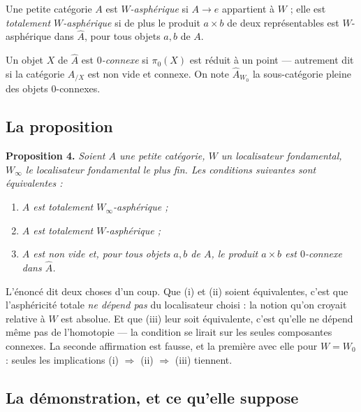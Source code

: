 \documentclass[11pt,a4paper]{article}
\begin{document}
Une petite catégorie $A$ est \emph{$W$-asphérique} si $A \to e$ appartient à
$W$ ; elle est \emph{totalement $W$-asphérique} si de plus le produit
$a \times b$ de deux représentables est $W$-asphérique dans $\hat{A}$, pour tous
objets $a, b$ de $A$.

Un objet $X$ de $\hat{A}$ est \emph{$0$-connexe} si $\pi_{0}(X)$ est réduit à un
point — autrement dit si la catégorie $A_{/X}$ est non vide et connexe. On note
$\hat{A}_{W_{0}}$ la sous-catégorie pleine des objets $0$-connexes.

\subsection*{La proposition}

\textbf{Proposition 4.} \emph{Soient $A$ une petite catégorie, $W$ un
localisateur fondamental, $W_{\infty}$ le localisateur fondamental le plus fin.
Les conditions suivantes sont équivalentes :}

\begin{enumerate}
\item[(i)] \emph{$A$ est totalement $W_{\infty}$-asphérique ;}
\item[(ii)] \emph{$A$ est totalement $W$-asphérique ;}
\item[(iii)] \emph{$A$ est non vide et, pour tous objets $a, b$ de $A$, le
produit $a \times b$ est $0$-connexe dans $\hat{A}$.}
\end{enumerate}

L'énoncé dit deux choses d'un coup. Que (i) et (ii) soient équivalentes, c'est
que l'asphéricité totale \emph{ne dépend pas} du localisateur choisi : la notion
qu'on croyait relative à $W$ est absolue. Et que (iii) leur soit équivalente,
c'est qu'elle ne dépend même pas de l'homotopie — la condition se lirait sur les
seules composantes connexes. La seconde affirmation est fausse, et la première
avec elle pour $W = W_{0}$ : seules les implications
(i) $\Rightarrow$ (ii) $\Rightarrow$ (iii) tiennent.

\subsection*{La démonstration, et ce qu'elle suppose}
\end{document}
